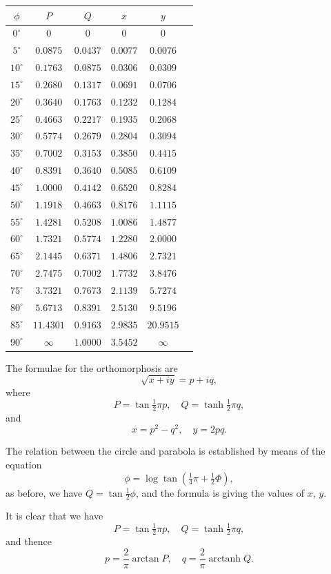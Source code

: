 \documentclass[11pt,a4paper]{article}
\theoremstyle{definition}
\DeclareMathOperator{\arctanh}{arctanh}
\begin{document}
\begin{tabular}{ccc|ccc}
$\phi$ & $P$ & $Q$ & $x$ & $y$ \\
\hline
$0^\circ$ & $0$ & $0$ & $0$ & $0$ \\
$5^\circ$ & $0.0875$ & $0.0437$ & $0.0077$ & $0.0076$ \\
$10^\circ$ & $0.1763$ & $0.0875$ & $0.0306$ & $0.0309$ \\
$15^\circ$ & $0.2680$ & $0.1317$ & $0.0691$ & $0.0706$ \\
$20^\circ$ & $0.3640$ & $0.1763$ & $0.1232$ & $0.1284$ \\
$25^\circ$ & $0.4663$ & $0.2217$ & $0.1935$ & $0.2068$ \\
$30^\circ$ & $0.5774$ & $0.2679$ & $0.2804$ & $0.3094$ \\
$35^\circ$ & $0.7002$ & $0.3153$ & $0.3850$ & $0.4415$ \\
$40^\circ$ & $0.8391$ & $0.3640$ & $0.5085$ & $0.6109$ \\
$45^\circ$ & $1.0000$ & $0.4142$ & $0.6520$ & $0.8284$ \\
$50^\circ$ & $1.1918$ & $0.4663$ & $0.8176$ & $1.1115$ \\
$55^\circ$ & $1.4281$ & $0.5208$ & $1.0086$ & $1.4877$ \\
$60^\circ$ & $1.7321$ & $0.5774$ & $1.2280$ & $2.0000$ \\
$65^\circ$ & $2.1445$ & $0.6371$ & $1.4806$ & $2.7321$ \\
$70^\circ$ & $2.7475$ & $0.7002$ & $1.7732$ & $3.8476$ \\
$75^\circ$ & $3.7321$ & $0.7673$ & $2.1139$ & $5.7274$ \\
$80^\circ$ & $5.6713$ & $0.8391$ & $2.5130$ & $9.5196$ \\
$85^\circ$ & $11.4301$ & $0.9163$ & $2.9835$ & $20.9515$ \\
$90^\circ$ & $\infty$ & $1.0000$ & $3.5452$ & $\infty$
\end{tabular}

\bigskip

The formulae for the orthomorphosis are
\[
\sqrt{x+iy} = p + iq,
\]
where
\[
P = \tan \tfrac{1}{2}\pi p, \quad Q = \tanh \tfrac{1}{2}\pi q,
\]
and
\[
x = p^2 - q^2, \quad y = 2pq.
\]

The relation between the circle and parabola is established by means of the equation
\[
\phi = \log \tan(\tfrac{1}{4}\pi + \tfrac{1}{2}\Phi),
\]
as before, we have $Q = \tan \tfrac{1}{2}\phi$, and the formula is giving the values of $x$, $y$.

It is clear that we have
\[
P = \tan \tfrac{1}{2}\pi p, \quad Q = \tanh \tfrac{1}{2}\pi q,
\]
and thence
\[
p = \frac{2}{\pi}\arctan P, \quad q = \frac{2}{\pi}\arctanh Q.
\]
\end{document}
